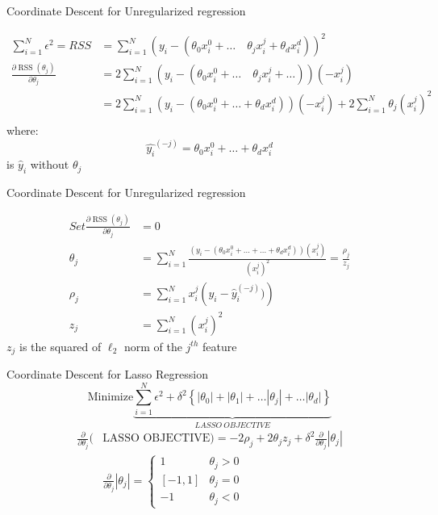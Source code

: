 \documentclass{beamer}
\begin{document}
\begin{frame}{Coordinate Descent for Unregularized regression}

\begin{align*}
\sum_{i=1}^{N}  \epsilon^{2}=RSS &=\sum_{i=1}^{N}\left(y_{i}-\left(\theta_{0}x_{i}^{0}+\ldots \quad \theta_{j} x_{i}^{j}+\theta_{d} x_{i}^{d}\right)\right)^{2}\\
\frac{\partial \operatorname{RSS}\left(\theta_{j}\right)}{\partial \theta_{j}}&= 2 \sum_{i=1}^{N}\left(y_{i}-\left(\theta_{0}x_{i}^{0}+\ldots \quad \theta_{j} x_{i}^{j}+\ldots \right)\right)\left(-x_{i}^{j}\right)\\
&=2\sum_{i=1}^{N}\left(y_{i}-\left(\theta_{0} x_{i}^{0}+\ldots + \theta_{d} x_{i}^{d}\right)\right)\left(-x_{i}^{j}\right)+2 \sum_{i=1}^{N} \theta_{j}(x_{i}^j)^2\\
\end{align*}
\pause where: $$\hat{y_{i}}^{(-j)} = \theta_{0} x_{i}^{0}+\ldots + \theta_{d} x_{i}^{d}$$ is $\hat{y}_{i}$ without $\theta_{j}$
\end{frame}

\begin{frame}{Coordinate Descent for Unregularized regression}

\begin{align*}
	Set \frac{\partial \operatorname{RSS}\left(\theta_{j}\right)}{\partial \theta_{j}}&= 0\\
    \theta_{j}&=\sum_{i=1}^{N} \frac{\left(y_{i}-\left(\theta_{0} x_{i}^{0}+\ldots + \ldots + \theta_{d}
    x_{i}^{d}\right)\right)\left(x_{i}^{j}\right)}{\left(x_{i}^{j}\right)^{2}}= \frac{\rho_{j}}{z_{j}}\\
    \rho_{j} &=\sum_{i=1}^{N} x_{i}^{j}\left(y_{i}-{\hat{y}_{i}^{(-j)}})\right)\\
    z_{j}&=\sum_{i=1}^{N}\left(x_{i}^{j}\right)^{2}
\end{align*}
$z_{j}$ is the squared of $\ell_2$ norm of the $j^{th}$ feature
\end{frame}

{
	
}




\begin{frame}{Coordinate Descent for Lasso Regression}
\[
  \text{Minimize} \underbrace{\sum_{i=1}^{N} \epsilon^{2} + \delta^{2}\left\{\left|\theta_{0}\right|+\left|\theta_{1}\right|+\ldots\left|\theta_{j}\right|+\ldots |\theta_{d}|\right\}}_{LASSO \: OBJECTIVE}
\]
\begin{align*}
\frac{\partial}{\partial \theta_{j}}(& \text {LASSO OBJECTIVE})=-2 \rho_{j}+2 \theta_{j} z_{j}+\delta^{2}{\frac{\partial}{\partial \theta_{j}}}\left|\theta_{j}\right|\\[18pt]
&\frac{\partial}{\partial \theta_{j}}\left|\theta_{j}\right|=\left\{\begin{array}{cc}
{1} & {\theta_{j}>0} \\
{[-1,1]} & {\theta_{j}=0} \\
{-1} & {\theta_{j}<0}
\end{array}\right.
\end{align*}
\end{frame}
\end{document}
